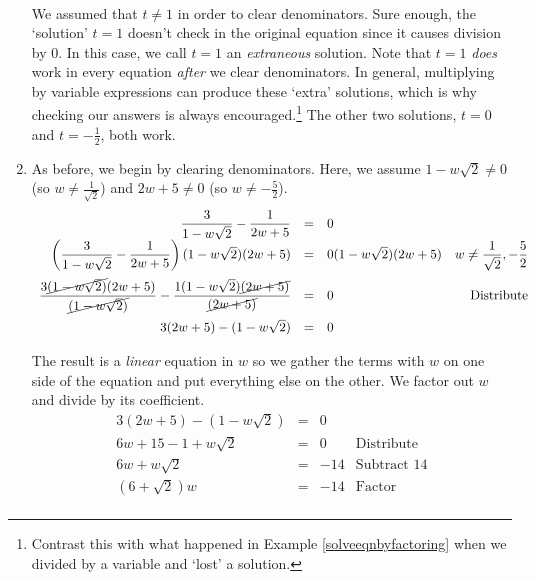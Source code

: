 \documentclass[10pt]{article}
\begin{document}
\begin{ex}
\begin{enumerate}
\[\begin{array}{rclr}
\end{array}\] We assumed that $t \neq 1$ in order to clear denominators.  Sure enough, the `solution' $t = 1$ doesn't check in the original equation since it causes division by $0$.  In this case, we call $t = 1$ an \textit{extraneous} solution.  Note that $t=1$ \textit{does} work in every equation \textit{after} we clear denominators.  In general, multiplying by variable expressions can produce these `extra' solutions, which is why checking our answers is always encouraged.\footnote{Contrast this with what happened in  Example \ref{solveeqnbyfactoring} when we divided by a variable and `lost' a solution.}  The other two solutions, $t = 0$ and $t = -\frac{1}{2}$, both work.

\item  As before, we begin by clearing denominators.  Here, we assume $1 - w\sqrt{2} \neq 0$ (so $w \neq \frac{1}{\sqrt{2}}$) and $2w+5 \neq 0$ (so $w \neq -\frac{5}{2}$).\[ \begin{array}{rclr}

 \dfrac{3}{1 - w\sqrt{2}} - \dfrac{1}{2w+5} & = &  0 & \\

\left(\dfrac{3}{1 - w\sqrt{2}} - \dfrac{1}{2w+5}\right)(1 - w\sqrt{2})(2w+5) & = &  0 (1 - w\sqrt{2})(2w+5)  & w \neq \dfrac{1}{\sqrt{2}}, -\dfrac{5}{2} \\ [12pt]

\dfrac{3\cancel{(1 - w\sqrt{2})}(2w+5) }{\cancel{(1 - w\sqrt{2})}}- \dfrac{1(1 - w\sqrt{2})\cancel{(2w+5)}}{\cancel{(2w+5)}} & = & 0 & \text{Distribute} \\ [12pt]

3(2w+5) - (1-w\sqrt{2}) & = & 0 & \\  \end{array}\]

The result is a \textit{linear} equation in $w$ so we gather the terms with $w$ on one side of the equation and put everything else on the other.  We factor out $w$ and divide by its coefficient. \[ \begin{array}{rclr}

3(2w+5) - (1-w\sqrt{2}) & = & 0 & \\

6w + 15 - 1 + w\sqrt{2} & = & 0 & \text{Distribute} \\

6w + w\sqrt{2} & = & -14 & \text{Subtract $14$} \\

(6 + \sqrt{2})w & = & -14 & \text{Factor} \\


\end{array}\]
\end{enumerate}
\end{ex}
\end{document}
